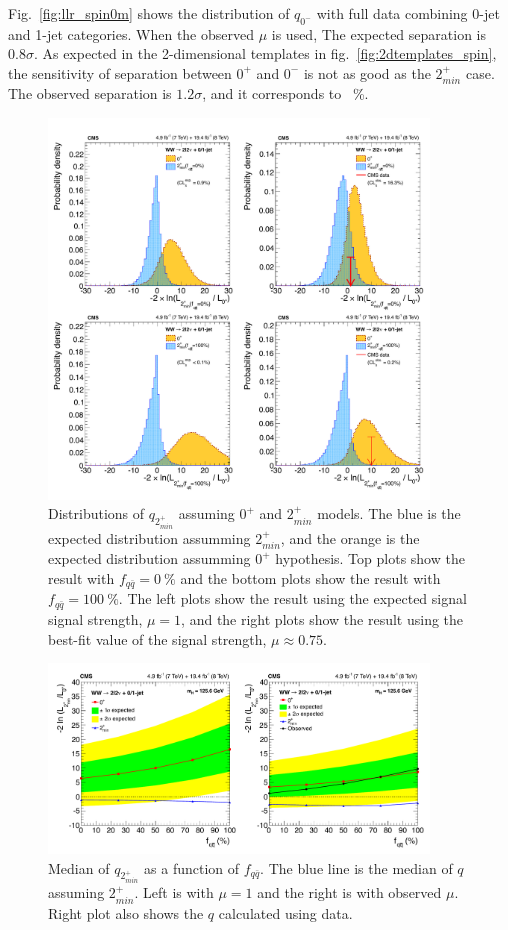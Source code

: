 Fig.~\ref{fig:llr_spin0m} shows the distribution of $q_{0^-}$ with full data 
combining 0-jet and 1-jet categories. When the observed $\mu$ is used, 
The expected separation is $0.8\sigma$.  
As expected in the 2-dimensional templates in fig.~\ref{fig:2dtemplates_spin},
the sensitivity of separation between $0^+$ and $0^-$ is 
not as good as the $2_{min}^+$ case.
The observed separation is $1.2\sigma$, and it corresponds to ~\%. 

%
\begin{figure}[ht!] 
\centering 
\includegraphics[width=0.9\textwidth]{figures/spin2LLR.pdf}
\caption{Distributions of $q_{2_{min}^+}$ assuming $0^+$ and $2_{min}^+$ models.  
The blue is the expected distribution assumming 
$2_{min}^+$, and the orange is the expected distribution assumming $0^+$ hypothesis.
Top plots show the result with $f_{q\bar{q}}=0~\%$ and the bottom plots show 
the result with $f_{q\bar{q}}=100~\%$. The left plots show the result using the 
expected signal signal strength, $\mu=1$, 
and the right plots show the result using the best-fit value of the signal strength, 
$\mu \approx 0.75$.}  
\label{fig:llr_spin2} 
\end{figure} 
%
\begin{figure}[ht!] 
\centering 
\includegraphics[width=0.9\textwidth]{figures/spinLLRband.pdf}
\caption{Median of $q_{2_{min}^+}$ as a function of $f_{q\bar{q}}$. 
The blue line is the median of $q$ assuming $2_{min}^+$.
Left is with $\mu=1$ and the right is with observed $\mu$.
Right plot also shows the $q$ calculated using data. 
} 
\label{fig:llr_band} 
\end{figure} 

